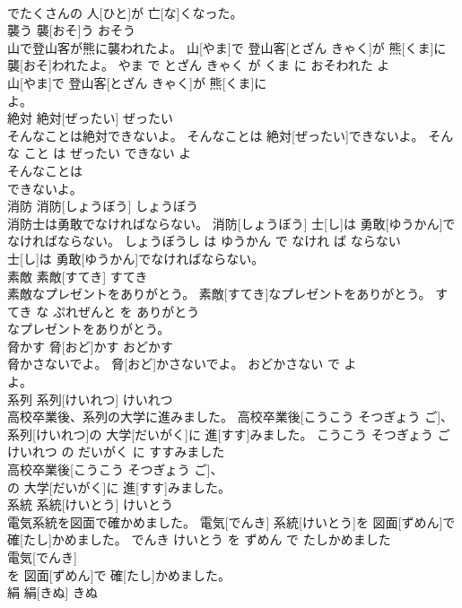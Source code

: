 \documentclass[8pt]{extreport}
\begin{document}
\begin{CJK}{UTF8}{min}
\\	でたくさんの 人[ひと]が 亡[な]くなった。			
\\	襲う	襲[おそ]う	おそう	
\\	山で登山客が熊に襲われたよ。	山[やま]で 登山客[とざん きゃく]が 熊[くま]に 襲[おそ]われたよ。	やま で とざん きゃく が くま に おそわれた よ	
\\	山[やま]で 登山客[とざん きゃく]が 熊[くま]に
\\	よ。			
\\	絶対	絶対[ぜったい]	ぜったい	
\\	そんなことは絶対できないよ。	そんなことは 絶対[ぜったい]できないよ。	そんな こと は ぜったい できない よ	
\\	そんなことは
\\	できないよ。			
\\	消防	消防[しょうぼう]	しょうぼう	
\\	消防士は勇敢でなければならない。	消防[しょうぼう] 士[し]は 勇敢[ゆうかん]でなければならない。	しょうぼうし は ゆうかん で なけれ ば ならない	
\\	士[し]は 勇敢[ゆうかん]でなければならない。			
\\	素敵	素敵[すてき]	すてき	
\\	素敵なプレゼントをありがとう。	素敵[すてき]なプレゼントをありがとう。	すてき な ぷれぜんと を ありがとう	
\\	なプレゼントをありがとう。			
\\	脅かす	脅[おど]かす	おどかす	
\\	脅かさないでよ。	脅[おど]かさないでよ。	おどかさない で よ	
\\	よ。			
\\	系列	系列[けいれつ]	けいれつ	
\\	高校卒業後、系列の大学に進みました。	高校卒業後[こうこう そつぎょう ご]、 系列[けいれつ]の 大学[だいがく]に 進[すす]みました。	こうこう そつぎょう ご けいれつ の だいがく に すすみました	
\\	高校卒業後[こうこう そつぎょう ご]、
\\	の 大学[だいがく]に 進[すす]みました。			
\\	系統	系統[けいとう]	けいとう	
\\	電気系統を図面で確かめました。	電気[でんき] 系統[けいとう]を 図面[ずめん]で 確[たし]かめました。	でんき けいとう を ずめん で たしかめました	
\\	電気[でんき]
\\	を 図面[ずめん]で 確[たし]かめました。			
\\	絹	絹[きぬ]	きぬ	

\end{CJK}
\end{document}
